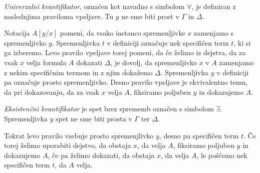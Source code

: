 \begin{definicija}
	\emph{Univerzalni kvantifikator}, označen kot navadno s simbolom $\forall$, je definiran z naslednjima praviloma vpeljave. Tu $y$ ne sme biti prost v $\Gamma$ in $\Delta$.
	\begin{center}
        \begin{bprooftree}
        \end{bprooftree}
        \begin{bprooftree}
        \end{bprooftree}
	\end{center}
	Notacija $A[y/x]$ pomeni, da vsako instanco spremenljivke $x$ zamenjamo s spremenljivko $y$. Spremenljivka $t$ v definiciji označuje nek specifičen term $t$, ki si ga izberemo. Levo pravilo vpeljave torej pomeni, da če želimo iz dejstva, da za vsak $x$ velja formula $A$ dokazati $\Delta$, je dovolj, da spremenljivko $x$ v $A$ zamenjamo z nekim specifičnim termom in z njim dokažemo $\Delta$. Spremenljivka $y$ v definiciji pa označuje prosto spremenljivko. Desno pravilo vpeljave je ekvivalentno temu, da pri dokazovanju, da za vsak $x$ velja $A$, fiksiramo poljuben $y$ in dokazujemo $A$.
\end{definicija}

\begin{definicija}
    \emph{Eksistenčni kvantifikator} je spet brez sprememb označen s simbolom $\exists$. Spremenljivka $y$ spet ne sme  biti prosta v $\Gamma$ ter $\Delta$.
    \begin{center}
        \begin{bprooftree}
        \end{bprooftree}
        \begin{bprooftree}
        \end{bprooftree}
	\end{center}
	Tokrat levo pravilo vsebuje prosto spremenjlivko $y$, desno pa specifičen term $t$. Če torej želimo uporabiti dejstvo, da obstaja $x$, da velja $A$, fiksiramo poljuben $y$ in dokazujemo $A$, če pa želimo dokazati, da obstaja $x$, da velja $A$, le poščemo nek specifičen term $t$, da $A$ velja.
\end{definicija}
